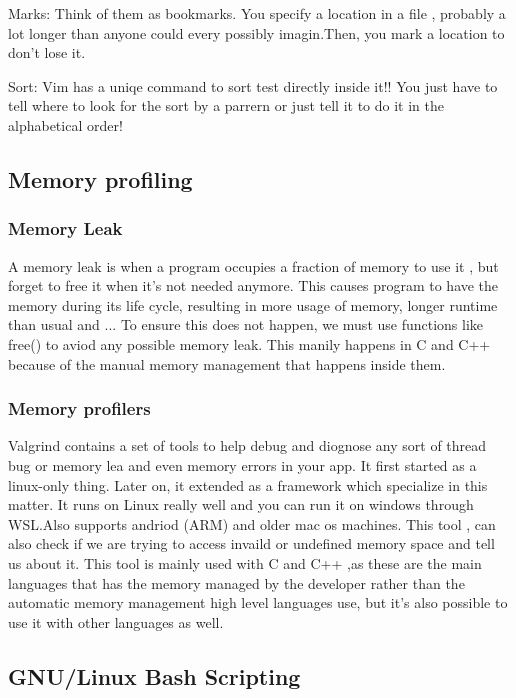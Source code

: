 \documentclass[titlepage]{article}
\begin{document}
Marks: Think of them as bookmarks. You specify a location in a file , probably a lot longer than anyone could every possibly imagin.Then, you mark a location to don't lose it.

Sort: Vim has a uniqe command to sort test directly inside it!! You just have to tell where to look for the sort by a parrern or just tell it to do it in the alphabetical order!
\subsection{Memory profiling}
\subsubsection{Memory Leak}
A memory leak is when a program occupies  a fraction of memory to use it , but forget to free it when it's not needed anymore.
This causes program to have the memory during its life cycle, resulting in more usage of memory, longer runtime than usual and ...
To ensure this does not happen,  we must use functions like free() to aviod any possible memory leak.
This manily happens in C and C++ because of the manual memory management that happens inside them.
\subsubsection{Memory profilers}
Valgrind contains a set of tools to help debug and diognose any sort of thread bug or memory lea and even memory errors in your app.
It first started as a linux-only thing. Later on, it extended as a framework which specialize in this matter.
It runs on Linux really well and you can run it on windows through WSL.Also supports andriod (ARM) and older mac os machines.
This tool , can also check if we are trying to access invaild or undefined memory space and tell us about it.
This tool is mainly used with C and C++ ,as these are the main languages that has the memory managed by the developer rather than the automatic memory management high level languages use,
but it's also possible to use it with other languages as well.
\subsection{GNU/Linux Bash Scripting}
\end{document}
